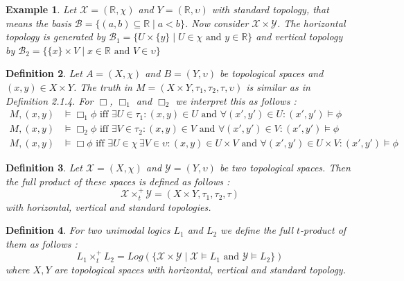 \documentclass[12pt, a4paper]{scrartcl}
\newtheorem{definition}{Definition}[subsection]
\newtheorem{example}[definition]{Example}
\begin{document}
\begin{example}
    Let $\mathcal{X} = (\mathbb{R}, \chi)$ and $Y = (\mathbb{R}, \upsilon)$ with standard topology, that means the basis $\mathcal{B} = \{(a,b) \subseteq \mathbb{R} \mid a < b\}$. Now consider $\mathcal{X} \times \mathcal{Y}$. 
    The horizontal topology is generated by $\mathcal{B}_1 = \{U \times \{y\} \mid U \in \chi \mbox{ and } y \in \mathbb{R}\}$ and vertical topology by 
    $\mathcal{B}_2 = \{\{x\} \times V \mid  x \in \mathbb{R} \mbox{ and }V \in \upsilon\}$
\end{example}

\begin{definition}
    Let $A = (X, \chi)$ and $B =(Y, \upsilon)$ be topological spaces and $(x,y) \in X \times Y$. The truth in $M = (X\times Y, \tau_1,\tau_2,\tau, \upsilon)$ is similar as in Definition 2.1.4.
    For $\Box$, $\Box_1$ and $\Box_2$ we interpret this as follows : 
    \begin{align*}
        M,(x,y) &\vDash \Box_1 \phi \mbox{ iff } \exists U \in \tau_1 : (x,y) \in U \mbox{ and } \forall(x',y') \in U : (x',y') \vDash \phi \\
        M,(x,y) &\vDash \Box_2 \phi \mbox{ iff } \exists V \in \tau_2 : (x,y) \in V \mbox{ and } \forall(x',y') \in V : (x',y') \vDash \phi \\
        M,(x,y) &\vDash \Box \phi \mbox{ iff } \exists U \in \chi \, \exists V \in \upsilon: (x,y) \in U \times V \mbox{ and } \forall(x',y') \in U \times V : (x',y') \vDash \phi
    \end{align*}

\end{definition}

\begin{definition}
    Let $\mathcal{X} = (X, \chi)$ and $\mathcal{Y} = (Y, \upsilon)$ be two topological spaces. Then the full product of these spaces is defined as follows :
    $$\mathcal{X} \times^+_t \mathcal{Y} = (X \times Y, \tau_1, \tau_2, \tau)$$
    with horizontal, vertical and standard topologies.
\end{definition}

\begin{definition}
    For two unimodal logics $L_1$ and $L_2$ we define the full $t$-product of them as follows :
    $$L_1 \times^+_t L_2 = Log(\{\mathcal{X} \times \mathcal{Y} \mid \mathcal{X} \vDash L_1 \mbox{ and } \mathcal{Y} \vDash L_2\})$$
    where $X,Y$ are topological spaces with horizontal, vertical and standard topology.
\end{definition}
\end{document}
